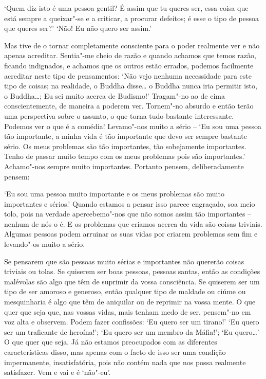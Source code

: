 `Quem diz isto é uma pessoa gentil? É assim que tu queres ser, essa
coisa que está sempre a queixar"-se e a criticar, a procurar defeitos; é
esse o tipo de pessoa que queres ser?' `Não! Eu não quero ser assim.'

Mas tive de o tornar completamente consciente para o poder realmente ver
e não apenas acreditar. Sentia"-me cheio de razão e quando achamos que 
temos razão, ficando indignados, e achamos que os outros estão errados, 
podemos facilmente acreditar neste tipo de pensamentos: `Não vejo nenhuma
necessidade para este tipo de coisas; na realidade, o Buddha disse\ldots{}
o Buddha nunca iria permitir isto, o Buddha\ldots{}; Eu sei
muito acerca de Budismo!' Tragam"-no ao de cima conscientemente, de
maneira a poderem ver. Tornem"-no absurdo e então terão uma perspectiva
sobre o assunto, o que torna tudo bastante interessante. Podemos ver o
que é a comédia! Levamo"-nos muito a sério -- `Eu sou uma pessoa tão
importante, a minha vida é tão importante que devo ser sempre bastante
sério. Os meus problemas são tão importantes, tão sobejamente
importantes. Tenho de passar muito tempo com os meus problemas pois
são importantes.' Achamo"-nos sempre muito importantes. Portanto pensem,
deliberadamente pensem:

`Eu sou uma pessoa muito importante e os meus problemas são muito
importantes e sérios.' Quando estamos a pensar isso parece engraçado,
soa meio tolo, pois na verdade apercebemo"-nos que não somos assim tão
importantes -- nenhum de nós o é. E os problemas que criamos acerca da
vida são coisas triviais. Algumas pessoas podem arruinar as suas vidas
por criarem problemas sem fim e levando"-os muito a sério.

Se pensarem que são pessoas muito sérias e importantes não quererão
coisas triviais ou tolas. Se quiserem ser boas pessoas, pessoas santas,
então as condições malévolas são algo que têm de suprimir da vossa
consciência. Se quiserem ser um tipo de ser amoroso e generoso, então
qualquer tipo de maldade ou ciúme ou mesquinharia é algo que têm de
aniquilar ou de reprimir na vossa mente. O que quer que seja que, nas
vossas vidas, mais tenham medo de ser, pensem"-no em voz alta e observem.
Podem fazer confissões: `Eu quero ser um tirano!' `Eu quero ser um
traficante de heroína!'; `Eu quero ser um membro da Máfia!'; `Eu quero\ldots{}'
O que quer que seja. Já não estamos preocupados com as diferentes 
características disso, mas apenas com o facto de isso ser uma condição
impermanente, insatisfatória, pois não contém nada que nos possa
realmente satisfazer. Vem e vai e é `não"-eu'.

